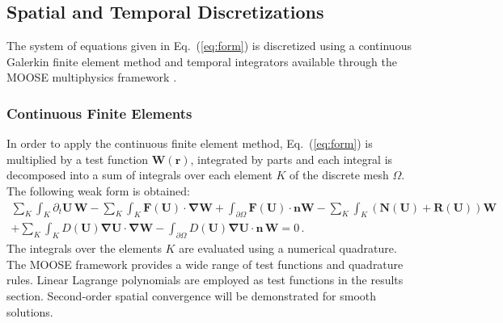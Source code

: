 \documentclass[preprint,10pt]{elsarticle}
\newcommand{\grad}{\mbold{\nabla}}
\newcommand{\mbold}[1]{\boldsymbol#1}
\newcommand{\eqt}[1]{Eq.~(\ref{#1})}                     %
\begin{document}
\subsection{Spatial and Temporal Discretizations} \label{sec:disc}
The system of equations given in \eqt{eq:form} is discretized using a continuous Galerkin finite element 
method and temporal integrators available through the MOOSE multiphysics framework \cite{MOOSE}.
\subsubsection{Continuous Finite Elements} 
In order to apply the continuous finite element method, \eqt{eq:form} is multiplied by a test function 
$\mathbf W(\mbold{r})$, integrated by parts and each integral is decomposed into a sum of integrals over 
each element $K$ of the discrete mesh $\Omega$. The following weak form is obtained:
\begin{multline}\label{eq:cfem}
\sum_K \int_{K} \partial_t \mathbf U \, \mathbf W - \sum_K \int_{K} \mathbf F (\mathbf U) \cdot \grad \mathbf W + \int_{\partial \Omega} \mathbf F (\mathbf U) \cdot \mbold{n} \mathbf W - \sum_K \int_{K} \left( \mathbf N (\mathbf U) + \mathbf R (\mathbf U) \right) \mathbf W  \\
+ \sum_K \int_{K} D(\mathbf U) \grad \mathbf U \cdot \grad \mathbf W 
- \int_{\partial \Omega} D(\mathbf U) \grad \mathbf U \cdot \mbold{n} \, \mathbf W = 0 \,.
\end{multline}
The integrals over the elements $K$ are evaluated using a numerical quadrature. The MOOSE framework 
provides a wide range of test functions and quadrature rules. Linear Lagrange polynomials are employed 
as test functions in the results section. Second-order spatial convergence will be demonstrated for smooth solutions. 
%
\end{document}
